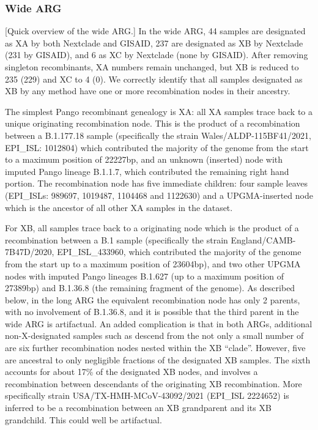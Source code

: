 \documentclass{article}
\begin{document}
\subsubsection{Wide ARG}
[Quick overview of the wide ARG.]
In the wide ARG, 44 samples are designated as XA by both Nextclade and GISAID, 237 are designated as XB by Nextclade (231 by GISAID), and 6 as XC by Nextclade (none by GISAID). After removing singleton recombinants, XA numbers remain unchanged, but XB is reduced to 235 (229) and XC to 4 (0). We correctly identify that all samples designated as XB by any method have one or more recombination nodes in their ancestry.

The simplest Pango recombinant genealogy is XA: all XA samples trace back to a unique originating recombination node. This is the product of a recombination between a B.1.177.18 sample (specifically the strain Wales/ALDP-115BF41/2021, EPI\_ISL: 1012804) which contributed the majority of the genome from the start to a maximum position of 22227bp, and an unknown (inserted) node with imputed Pango lineage B.1.1.7, which contributed the remaining right hand portion. The recombination node has five immediate children: four sample leaves (EPI\_ISLs: 989697, 1019487, 1104468 and 1122630) and a UPGMA-inserted node which is the ancestor of all other XA samples in the dataset.

For XB, all samples trace back to a originating node which is the product of a recombination between a B.1 sample (specifically the strain England/CAMB-7B47D/2020, EPI\_ISL\_433960, which contributed the majority of the genome from the start up to a maximum position of 23604bp), and two other UPGMA nodes with imputed Pango lineages B.1.627 (up to a maximum position of 27389bp) and B.1.36.8 (the remaining fragment of the genome). As described below, in the long ARG the equivalent recombination node has only 2 parents, with no involvement of  B.1.36.8, and it is possible that the third parent in the wide ARG is artifactual. An added complication is that in both ARGs, additional non-X-designated samples such as descend from the not only a small number of are six further recombination nodes nested within the XB ``clade''. However, five are ancestral to only negligible fractions of the designated XB samples. The sixth accounts for about 17\% of the designated XB nodes, and involves a recombination between descendants of the originating XB recombination. More specifically strain USA/TX-HMH-MCoV-43092/2021 (EPI\_ISL 2224652) is inferred to be a recombination between an XB grandparent and its XB grandchild. This could well be artifactual.
\end{document}
